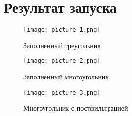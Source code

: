 \documentclass[a4paper, 14pt]{extarticle}
\begin{document}
\section{Результат запуска}
    
\begin{figure}[!htb]
	\centering
	\texttt{[image: picture\_1.png]}
\caption{Заполненный треугольник}
\label{fig:picture_1.png}
\end{figure}

\begin{figure}[!htb]
	\centering
	\texttt{[image: picture\_2.png]}
\caption{Заполненный многоугольник}
\label{fig:picture_2.png}
\end{figure}

\begin{figure}[!htb]
	\centering
	\texttt{[image: picture\_3.png]}
\caption{Многоугольник с постфильтрацией}
\label{fig:picture_3.png}
\end{figure}
\end{document}
